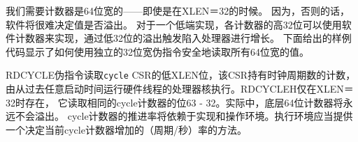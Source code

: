 \begin{commentary}
  我们需要计数器是64位宽的——即使是在XLEN＝32的时候。
  因为，否则的话，软件将很难决定值是否溢出。
  对于一个低端实现，各计数器的高32位可以使用软件计数器来实现，通过低32位的溢出触发陷入处理器进行增长。
  下面给出的样例代码显示了如何使用独立的32位宽伪指令安全地读取所有64位宽的值。
\end{commentary}

RDCYCLE伪指令读取{\tt cycle} CSR的低XLEN位，该CSR持有时钟周期数的计数，
由从过去任意启动时间运行硬件线程的处理器核执行。RDCYCLEH仅在XLEN＝32时存在，
它读取相同的cycle计数器的位63 - 32。实际中，底层64位计数器将永远不会溢出。
cycle计数器的推进率将依赖于实现和操作环境。执行环境应当提供一个决定当前cycle计数器增加的（周期/秒）率的方法。

